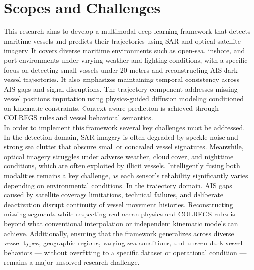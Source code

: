 \section{Scopes and Challenges}
This research aims to develop a multimodal deep learning framework that detects maritime vessels and predicts their trajectories using SAR and optical satellite imagery.  It covers diverse maritime environments such as open-sea, inshore, and port environments under varying weather and lighting conditions, with a specific focus on detecting small vessels under 20 meters and reconstructing AIS-dark vessel trajectories. It also emphasizes maintaining temporal consistency across AIS gaps and signal disruptions. The trajectory component addresses missing vessel positions imputation using physics-guided diffusion modeling conditioned on kinematic constraints. Context-aware prediction is achieved through COLREGS rules and vessel behavioral semantics.\\

In order to implement this framework several key challenges must be addressed. In the detection domain, SAR imagery is often degraded by speckle noise and strong sea clutter that obscure small or concealed vessel signatures. Meanwhile, optical imagery struggles under adverse weather, cloud cover, and nighttime conditions, which are often exploited by illicit vessels. Intelligently fusing both modalities remains a key challenge, as each sensor’s reliability significantly varies depending on environmental conditions. In the trajectory domain, AIS gaps caused by satellite coverage limitations, technical failures, and deliberate deactivation disrupt continuity of vessel movement histories. Reconstructing missing segments while respecting real ocean physics and COLREGS rules is beyond what conventional interpolation or independent kinematic models can achieve. Additionally, ensuring that the framework generalizes across diverse vessel types, geographic regions, varying sea conditions, and unseen dark vessel behaviors — without overfitting to a specific dataset or operational condition — remains a major unsolved research challenge.






